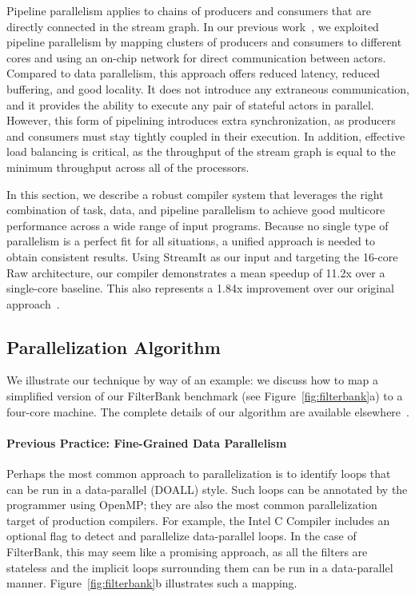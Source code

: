 Pipeline parallelism applies to chains of producers and consumers that
are directly connected in the stream graph.  In our previous
work~\cite{gordon-asplos02}, we exploited pipeline parallelism by
mapping clusters of producers and consumers to different cores and
using an on-chip network for direct communication between actors.
Compared to data parallelism, this approach offers reduced latency,
reduced buffering, and good locality.  It does not introduce any
extraneous communication, and it provides the ability to execute any
pair of stateful actors in parallel.  However, this form of pipelining
introduces extra synchronization, as producers and consumers must stay
tightly coupled in their execution.  In addition, effective load
balancing is critical, as the throughput of the stream graph is equal
to the minimum throughput across all of the processors.

In this section, we describe a robust compiler system that leverages
the right combination of task, data, and pipeline parallelism to
achieve good multicore performance across a wide range of input
programs.  Because no single type of parallelism is a perfect fit for
all situations, a unified approach is needed to obtain consistent
results.  Using StreamIt as our input and targeting the 16-core Raw
architecture, our compiler demonstrates a mean speedup of 11.2x over a
single-core baseline.  This also represents a 1.84x improvement over
our original approach~\cite{gordon-asplos02}.

\subsection*{Parallelization Algorithm}

We illustrate our technique by way of an example: we discuss how to
map a simplified version of our FilterBank benchmark (see
Figure~\ref{fig:filterbank}a) to a four-core machine.  The complete
details of our algorithm are available
elsewhere~\cite{gordon-asplos06}.

\paragraph*{Previous Practice: Fine-Grained Data Parallelism}  Perhaps 
the most common approach to parallelization is to identify loops that
can be run in a data-parallel (DOALL) style.  Such loops can be
annotated by the programmer using OpenMP; they are also the most
common parallelization target of production compilers.  For example,
the Intel C Compiler includes an optional flag to detect and
parallelize data-parallel loops.  In the case of FilterBank, this may
seem like a promising approach, as all the filters are stateless and
the implicit loops surrounding them can be run in a data-parallel
manner.  Figure~\ref{fig:filterbank}b illustrates such a mapping.

